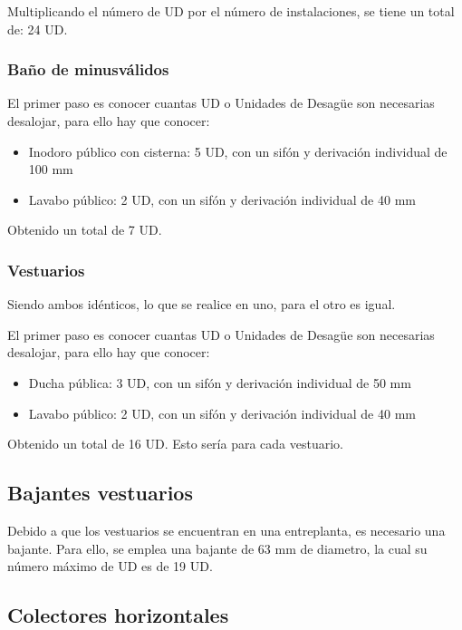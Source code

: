 \documentclass[../main.tex]{subfiles}
\begin{document}
Multiplicando el número de UD por el número de instalaciones, se tiene un total de: 24 UD. 

\subsubsection{Baño de minusválidos}

El primer paso es conocer cuantas UD o Unidades de Desagüe son necesarias desalojar, para ello hay que conocer:

\begin{itemize}
    \item Inodoro público con cisterna: 5 UD, con un sifón y derivación individual de 100 mm 
    \item Lavabo público: 2 UD, con un sifón y derivación individual de 40 mm
\end{itemize}

Obtenido un total de 7 UD.

\subsubsection{Vestuarios}

Siendo ambos idénticos, lo que se realice en uno, para el otro es igual. 

El primer paso es conocer cuantas UD o Unidades de Desagüe son necesarias desalojar, para ello hay que conocer:

\begin{itemize}
    \item Ducha pública: 3 UD, con un sifón y derivación individual de 50 mm 
    \item Lavabo público: 2 UD, con un sifón y derivación individual de 40 mm
\end{itemize}

Obtenido un total de 16 UD. Esto sería para cada vestuario.

\subsection{Bajantes vestuarios}

Debido a que los vestuarios se encuentran en una entreplanta, es necesario una bajante. Para ello, se emplea una bajante de 63 mm de diametro, la cual su número máximo de UD es de 19 UD.

\subsection{Colectores horizontales}
\end{document}
